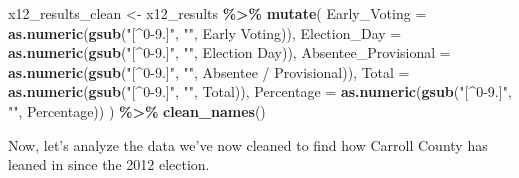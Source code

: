 \documentclass[
]{article}
\newenvironment{Shaded}{\begin{snugshade}}{\end{snugshade}}
\newcommand{\AttributeTok}[1]{\textcolor[rgb]{0.13,0.29,0.53}{#1}}
\newcommand{\FunctionTok}[1]{\textcolor[rgb]{0.13,0.29,0.53}{\textbf{#1}}}
\newcommand{\NormalTok}[1]{#1}
\newcommand{\OtherTok}[1]{\textcolor[rgb]{0.56,0.35,0.01}{#1}}
\newcommand{\SpecialCharTok}[1]{\textcolor[rgb]{0.81,0.36,0.00}{\textbf{#1}}}
\newcommand{\StringTok}[1]{\textcolor[rgb]{0.31,0.60,0.02}{#1}}
\begin{document}
\begin{Shaded}
\begin{Highlighting}[]
\NormalTok{x12\_results\_clean }\OtherTok{\textless{}{-}}\NormalTok{ x12\_results }\SpecialCharTok{\%\textgreater{}\%}
  \FunctionTok{mutate}\NormalTok{(}
    \AttributeTok{Early\_Voting =} \FunctionTok{as.numeric}\NormalTok{(}\FunctionTok{gsub}\NormalTok{(}\StringTok{"[\^{}0{-}9.]"}\NormalTok{, }\StringTok{""}\NormalTok{, }\StringTok{\textasciigrave{}}\AttributeTok{Early Voting}\StringTok{\textasciigrave{}}\NormalTok{)),}
    \AttributeTok{Election\_Day =} \FunctionTok{as.numeric}\NormalTok{(}\FunctionTok{gsub}\NormalTok{(}\StringTok{"[\^{}0{-}9.]"}\NormalTok{, }\StringTok{""}\NormalTok{, }\StringTok{\textasciigrave{}}\AttributeTok{Election Day}\StringTok{\textasciigrave{}}\NormalTok{)),}
    \AttributeTok{Absentee\_Provisional =} \FunctionTok{as.numeric}\NormalTok{(}\FunctionTok{gsub}\NormalTok{(}\StringTok{"[\^{}0{-}9.]"}\NormalTok{, }\StringTok{""}\NormalTok{, }\StringTok{\textasciigrave{}}\AttributeTok{Absentee / Provisional}\StringTok{\textasciigrave{}}\NormalTok{)),}
    \AttributeTok{Total =} \FunctionTok{as.numeric}\NormalTok{(}\FunctionTok{gsub}\NormalTok{(}\StringTok{"[\^{}0{-}9.]"}\NormalTok{, }\StringTok{""}\NormalTok{, Total)),}
    \AttributeTok{Percentage =} \FunctionTok{as.numeric}\NormalTok{(}\FunctionTok{gsub}\NormalTok{(}\StringTok{"[\^{}0{-}9.]"}\NormalTok{, }\StringTok{""}\NormalTok{, Percentage))}
\NormalTok{  ) }\SpecialCharTok{\%\textgreater{}\%}
  \FunctionTok{clean\_names}\NormalTok{()}
\end{Highlighting}
\end{Shaded}

Now, let's analyze the data we've now cleaned to find how Carroll County
has leaned in since the 2012 election.
\end{document}

